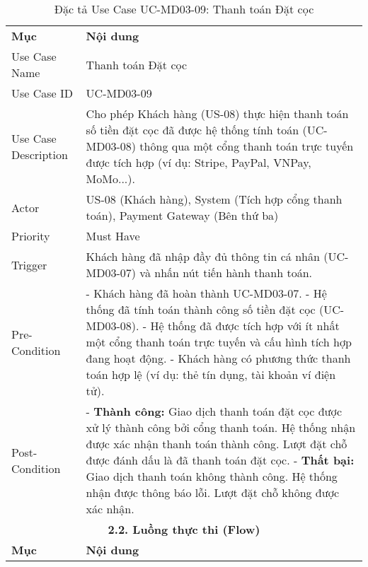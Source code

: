 \begin{longtable}{|m{4cm}|p{11cm}|}
\caption{Đặc tả Use Case UC-MD03-09: Thanh toán Đặt cọc} \label{tab:uc_md03_09} \\
\hline

\endhead %
\hline
\endfoot %
\hline
\endlastfoot %
\multicolumn{2}{|c|}{\textbf{2.1. Tóm tắt (Summary)}} \\
\hline
\textbf{Mục} & \textbf{Nội dung} \\
\hline
Use Case Name & Thanh toán Đặt cọc \\
\hline
Use Case ID & UC-MD03-09 \\
\hline
Use Case Description & Cho phép Khách hàng (US-08) thực hiện thanh toán số tiền đặt cọc đã được hệ thống tính toán (UC-MD03-08) thông qua một cổng thanh toán trực tuyến được tích hợp (ví dụ: Stripe, PayPal, VNPay, MoMo...). \\
\hline
Actor & US-08 (Khách hàng), System (Tích hợp cổng thanh toán), Payment Gateway (Bên thứ ba) \\
\hline
Priority & Must Have \\
\hline
Trigger & Khách hàng đã nhập đầy đủ thông tin cá nhân (UC-MD03-07) và nhấn nút tiến hành thanh toán. \\
\hline
Pre-Condition & - Khách hàng đã hoàn thành UC-MD03-07. \newline - Hệ thống đã tính toán thành công số tiền đặt cọc (UC-MD03-08). \newline - Hệ thống đã được tích hợp với ít nhất một cổng thanh toán trực tuyến và cấu hình tích hợp đang hoạt động. \newline - Khách hàng có phương thức thanh toán hợp lệ (ví dụ: thẻ tín dụng, tài khoản ví điện tử). \\
\hline
Post-Condition & - \textbf{Thành công:} Giao dịch thanh toán đặt cọc được xử lý thành công bởi cổng thanh toán. Hệ thống nhận được xác nhận thanh toán thành công. Lượt đặt chỗ được đánh dấu là đã thanh toán đặt cọc. \newline - \textbf{Thất bại:} Giao dịch thanh toán không thành công. Hệ thống nhận được thông báo lỗi. Lượt đặt chỗ không được xác nhận. \\
\hline
\multicolumn{2}{|c|}{\textbf{2.2. Luồng thực thi (Flow)}} \\
\hline
\textbf{Mục} & \textbf{Nội dung} \\
\hline

\end{longtable}
